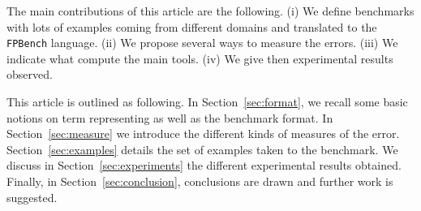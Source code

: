 \documentclass[main.tex]{subfiles}
\begin{document}
The main contributions of this article are the following.
(i) We define benchmarks with lots of examples coming from different domains and translated to the \texttt{FPBench} language. 
(ii) We propose several ways to measure the errors. 
(iii) We indicate what compute the main tools. 
(iv) We give then experimental results observed. 


This article is outlined as following. 
In Section~\ref{sec:format}, we recall some basic notions on term representing as well as the benchmark format. 
In Section~\ref{sec:measure} we introduce the different kinds of measures of the error. 
Section~\ref{sec:examples} details the set of examples taken to the benchmark.
We discuss in Section~\ref{sec:experiments} the different experimental results obtained.   
Finally, in Section~\ref{sec:conclusion}, conclusions are drawn and further work is suggested.  





%
%
%
%
%
\end{document}
